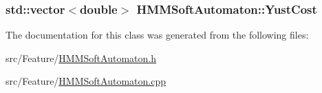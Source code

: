 \hypertarget{class_h_m_m_soft_automaton_af71284a9b8b08b442aff84a41a89b47e}{
\subsubsection[{Yust\+Cost}]{\setlength{\rightskip}{0pt plus 5cm}std\+::vector$<$double$>$ H\+M\+M\+Soft\+Automaton\+::\+Yust\+Cost\hspace{0.3cm}{\ttfamily [private]}}}\label{class_h_m_m_soft_automaton_af71284a9b8b08b442aff84a41a89b47e}


The documentation for this class was generated from the following files\+:\begin{DoxyCompactItemize}
\item 
src/\+Feature/\hyperlink{_h_m_m_soft_automaton_8h}{H\+M\+M\+Soft\+Automaton.\+h}\item 
src/\+Feature/\hyperlink{_h_m_m_soft_automaton_8cpp}{H\+M\+M\+Soft\+Automaton.\+cpp}\end{DoxyCompactItemize}

